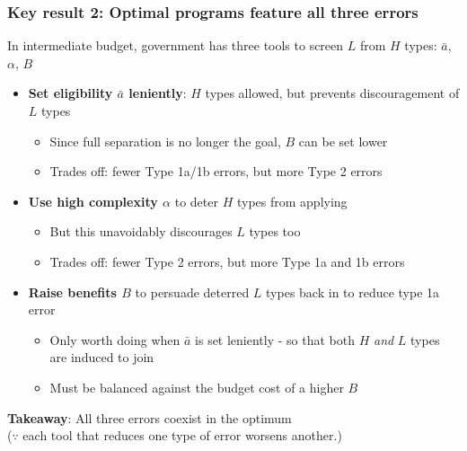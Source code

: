 \documentclass[aspectratio=169]{beamer}
\begin{document}
\begin{frame}
\frametitle{Key result 2: Optimal programs feature all three errors}
In intermediate budget, government has three tools to screen $L$ from $H$ types: $\bar{a}$, $\alpha$, $B$
\begin{itemize}\setlength\itemsep{6pt}
    \item \textbf{Set eligibility $\bar{a}$ leniently}: $H$ types allowed, but prevents discouragement of $L$ types
    \begin{itemize}\setlength\itemsep{3pt}
        \item Since full separation is no longer the goal, $B$ can be set lower
        \item Trades off: fewer Type 1a/1b errors, but more Type 2 errors
    \end{itemize}\medskip
    \item \textbf{Use high complexity $\alpha$} to deter $H$ types from applying
    \begin{itemize}\setlength\itemsep{3pt}
        \item But this unavoidably discourages $L$ types too
        \item Trades off: fewer Type 2 errors, but more Type 1a and 1b errors
    \end{itemize}\medskip
    \item \textbf{Raise benefits $B$} to persuade deterred $L$ types back in to reduce type 1a error
    \begin{itemize}\setlength\itemsep{3pt}
        \item Only worth doing when $\bar{a}$ is set leniently - so that both $H$ \textit{and} $L$ types are induced to join
        \item Must be balanced against the budget cost of a higher $B$
    \end{itemize}
\end{itemize}\medskip

\textbf{Takeaway}: All three errors coexist in the optimum\\ ($\because$ each tool that reduces one type of error worsens another.)

\end{frame}
\end{document}
